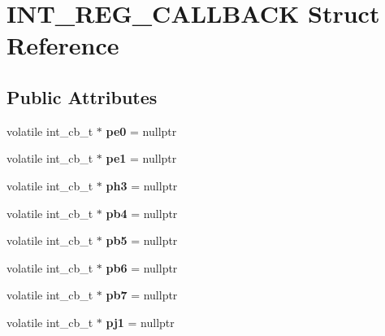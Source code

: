 \hypertarget{structINT__REG__CALLBACK}{}\section{I\+N\+T\+\_\+\+R\+E\+G\+\_\+\+C\+A\+L\+L\+B\+A\+CK Struct Reference}
\label{structINT__REG__CALLBACK}
\subsection*{Public Attributes}
\begin{DoxyCompactItemize}
\item 
\mbox{\label{structINT__REG__CALLBACK_aa932181035723b3de2ec5f82db946557}} 
volatile int\+\_\+cb\+\_\+t $\ast$ {\bfseries pe0} = nullptr
\item 
\mbox{\label{structINT__REG__CALLBACK_acbfc6b664a8852266985391d5dcefb7a}} 
volatile int\+\_\+cb\+\_\+t $\ast$ {\bfseries pe1} = nullptr
\item 
\mbox{\label{structINT__REG__CALLBACK_ae29f0525c9174e162bea4ef23a5b9d71}} 
volatile int\+\_\+cb\+\_\+t $\ast$ {\bfseries ph3} = nullptr
\item 
\mbox{\label{structINT__REG__CALLBACK_a43da983ddbba9d6a0c8cf96f1e3fc3f4}} 
volatile int\+\_\+cb\+\_\+t $\ast$ {\bfseries pb4} = nullptr
\item 
\mbox{\label{structINT__REG__CALLBACK_a219d24c34c9ced938e995fd58f435e43}} 
volatile int\+\_\+cb\+\_\+t $\ast$ {\bfseries pb5} = nullptr
\item 
\mbox{\label{structINT__REG__CALLBACK_ad819d37ce1f7d80a57a170f0c7b918fe}} 
volatile int\+\_\+cb\+\_\+t $\ast$ {\bfseries pb6} = nullptr
\item 
\mbox{\label{structINT__REG__CALLBACK_a89c3284d40d6a95ba349bd641c188a73}} 
volatile int\+\_\+cb\+\_\+t $\ast$ {\bfseries pb7} = nullptr
\item 
\mbox{\label{structINT__REG__CALLBACK_ad62a5473687b44b0d7a902bce7a7dacd}} 
volatile int\+\_\+cb\+\_\+t $\ast$ {\bfseries pj1} = nullptr

\end{DoxyCompactItemize}
